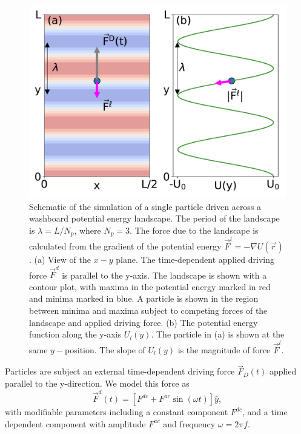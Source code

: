 \documentclass[twocolumn,preprintnumbers,amsmath,amssymb,aps,prx]{revtex4}
\begin{document}
\begin{center}
\begin{figure}[h!]
\centering
\includegraphics[width=\columnwidth]{landscape.pdf}
\caption{
  Schematic of the simulation
  of a single particle
  driven across a washboard potential
  energy landscape.
  The period of the landscape is $\lambda = L/N_p$,  
  where $N_p = 3$.  
  The force due to the landscape %
  is calculated from the gradient of the potential
  energy 
  $\vec{F}^l = -\nabla U(\vec{r})$.
  (a) View of the $x-y$ plane. %
  The time-dependent applied driving force $\vec{F}^d$
  is parallel to the y-axis.
  The landscape is shown with a contour plot,
  with maxima in the potential energy marked in red
  and minima marked in blue.
  A particle is shown in the region between minima and maxima
  subject to competing forces of the landscape and applied driving force.
  (b) The potential energy function
  along the y-axis $U_l(y)$.  
  The particle in (a) is shown at the same $y-$position.
  The slope of $U_l(y)$ is the 
  magnitude of force $\vec{F}^l$. %
  }
\label{fig:landscape0}
\end{figure}
\end{center}

 
 Particles are subject an external time-dependent driving force
$\vec{F}_{D}(t)$
applied parallel to the y-direction.
We model this force as
\begin{equation}
  \vec{F}^{d}(t) = [F^{dc} + F^{ac} \sin(\omega t)] \hat{y},
    \label{eq:drive}
\end{equation}
with modifiable parameters including
a constant component $F^{dc}$,
and a time dependent component with amplitude $F^{ac}$
and frequency $\omega = 2 \pi f$.
\end{document}

